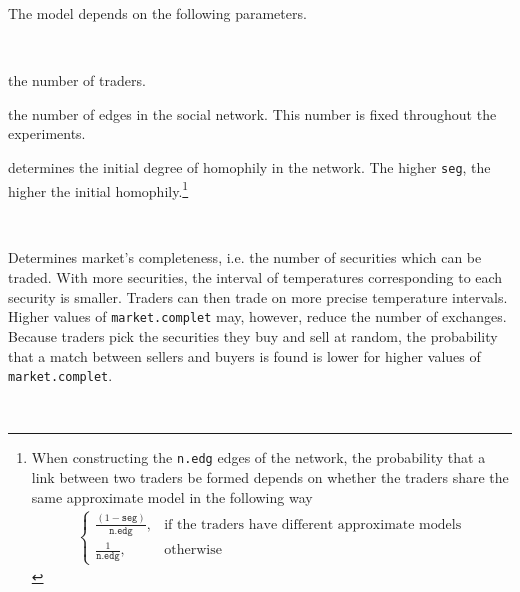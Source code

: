 \documentclass{sig-alternate}
\begin{document}
The model depends on the following parameters. 
\begin{description}
	\setlength\itemsep{0em}
	\item[Network parameters.]~
	\begin{description}
			\setlength\itemsep{0em}
		\item [\texttt{n.traders}:] the number of traders.
		\item [\texttt{n.edg} :] the number of edges in the social network. This number is fixed throughout the experiments.   
		\item [\texttt{seg} :] determines the initial degree of homophily in the network. The higher \texttt{seg}, the higher the initial homophily.\footnote{ When constructing the \texttt{n.edg} edges of the network, the probability that a link between two traders be formed depends on whether the traders share the same approximate model in the following way
			\begin{align*}
			\begin{cases}
			\frac{(1-\texttt{seg})}{\texttt{n.edg}},  &\text{if the traders have different approximate models}\\
			\frac{1}{\texttt{n.edg}},  & \text{otherwise}
			\end{cases}
			\end{align*}}
	\end{description}

\item[Market structure parameter.]~

		\begin{description}
			\setlength\itemsep{0em}
			\item [\texttt{market.complet}.] Determines market's completeness, i.e. the number of securities which can be traded. With more securities, the interval of temperatures corresponding to each security is smaller. Traders can then trade on more precise temperature intervals. Higher values of \texttt{market.complet} may, however, reduce the number of exchanges. Because traders pick the securities they buy and sell at random, the probability that a match between sellers and buyers is found is lower for higher values of \texttt{market.complet}.
		\end{description}
	 
\item[Behavioral parameters.]~


\end{description}
\end{document}
